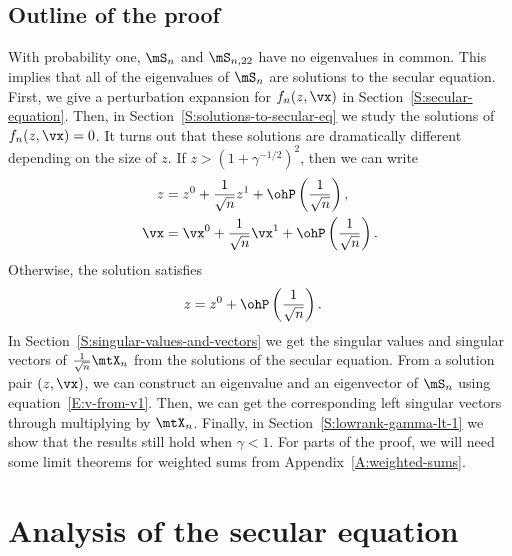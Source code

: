 \subsection{Outline of the proof}

With probability one, $\mS_n$ and $\mS_{n,22}$ have no eigenvalues in common.  This implies that all of the eigenvalues of $\mS_n$ are solutions to the secular equation.  First, we give a perturbation expansion for $f_n(z, \vx)$ in Section~\ref{S:secular-equation}.  Then, in Section~\ref{S:solutions-to-secular-eq} we study the solutions of  $f_n(z, \vx) = 0$.  It turns out that these solutions are dramatically different depending on the size of $z$.  If $z > (1 + \gamma^{-1/2})^2$, then we can write
\begin{align*}
    z 
        &= 
            z^0 
            + 
            \frac{1}{\sqrt{n}}
            z^1 
            + 
            \ohP\left( \frac{1}{\sqrt{n}} \right), \\
    \vx
        &=
            \vx^0
            +
            \frac{1}{\sqrt{n}}
            \vx^1
            + 
            \ohP\left( \frac{1}{\sqrt{n}} \right).
\end{align*}
Otherwise, the solution satisfies
\begin{align*}
    z
        &=
            z^0
            + 
            \ohP\left( \frac{1}{\sqrt{n}} \right).
\end{align*}
In Section~\ref{S:singular-values-and-vectors} we get the singular values and singular vectors of $\frac{1}{\sqrt{n}} \mtX_n$ from the solutions of the secular equation.  From a solution pair $(z, \vx)$, we can construct an eigenvalue and an eigenvector of $\mS_n$ using equation~\eqref{E:v-from-v1}.  Then, we can get the corresponding left singular vectors through multiplying by $\mtX_n$.  Finally, in Section~\ref{S:lowrank-gamma-lt-1} we show that the results still hold when $\gamma < 1$.  For parts of the proof, we will need some limit theorems for weighted sums from Appendix~\ref{A:weighted-sums}.

\section{Analysis of the secular equation}

